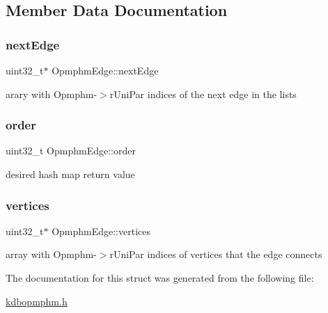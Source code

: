 \subsection{Member Data Documentation}
\mbox{\label{structOpmphmEdge_a4a0e9a3d422a25a57f52530f003c3a5e}} 
\subsubsection{\texorpdfstring{nextEdge}{nextEdge}}
{\footnotesize\ttfamily uint32\+\_\+t$\ast$ Opmphm\+Edge\+::next\+Edge}

arary with Opmphm-\/$>$r\+Uni\+Par indices of the next edge in the lists \mbox{\label{structOpmphmEdge_a0d125d2d8a97f191896b816123c09d14}} 
\subsubsection{\texorpdfstring{order}{order}}
{\footnotesize\ttfamily uint32\+\_\+t Opmphm\+Edge\+::order}

desired hash map return value \mbox{\label{structOpmphmEdge_ae8d5721fe78750b17b5d4a9b8e3fc2b2}} 
\subsubsection{\texorpdfstring{vertices}{vertices}}
{\footnotesize\ttfamily uint32\+\_\+t$\ast$ Opmphm\+Edge\+::vertices}

array with Opmphm-\/$>$r\+Uni\+Par indices of vertices that the edge connects 

The documentation for this struct was generated from the following file\+:\begin{DoxyCompactItemize}
\item 
\mbox{\hyperlink{kdbopmphm_8h}{kdbopmphm.\+h}}\end{DoxyCompactItemize}
